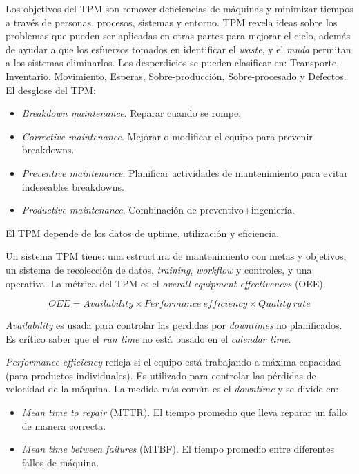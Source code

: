 \documentclass[oneside]{book}
\begin{document}
Los objetivos del TPM son remover deficiencias de máquinas y minimizar tiempos a través de personas, procesos, sistemas y entorno. TPM revela ideas sobre los problemas que pueden ser aplicadas en otras partes para mejorar el ciclo, además de ayudar a que los esfuerzos tomados en identificar el \textit{waste}, y el \textit{muda} permitan a los sistemas eliminarlos. Los desperdicios se pueden clasificar en: Transporte, Inventario, Movimiento, Esperas, Sobre-producción, Sobre-procesado y Defectos. El desglose del TPM:

\begin{itemize}
	\item \textit{Breakdown maintenance}. Reparar cuando se rompe.
	\item \textit{Corrective maintenance}. Mejorar o modificar el equipo para prevenir breakdowns.
	\item \textit{Preventive maintenance}. Planificar actividades de mantenimiento para evitar indeseables breakdowns.
	\item \textit{Productive maintenance}. Combinación de preventivo+ingeniería.
\end{itemize}

El TPM depende de los datos de uptime, utilización y eficiencia.

Un sistema TPM tiene: una estructura de mantenimiento con metas y objetivos, un sistema de recolección de datos, \textit{training}, \textit{workflow} y controles, y una operativa. La métrica del TPM es el \textit{overall equipment effectiveness} (OEE).

\begin{equation}
OEE = Availability \times Performance \ efficiency \times Quality \ rate
\end{equation}

\textit{Availability} es usada para controlar las perdidas por \textit{downtimes} no planificados. Es crítico saber que el \textit{run time} no está basado en el \textit{calendar time}.

\textit{Performance efficiency} refleja si el equipo está trabajando a máxima capacidad (para productos individuales). Es utilizado para controlar las pérdidas de velocidad de la máquina. La medida más común es el \textit{downtime} y se divide en:
\begin{itemize}
	\item \textit{Mean time to repair} (MTTR). El tiempo promedio que lleva reparar un fallo de manera correcta.
	\item \textit{Mean time between failures} (MTBF). El tiempo promedio entre diferentes fallos de máquina.
\end{itemize}
\end{document}
